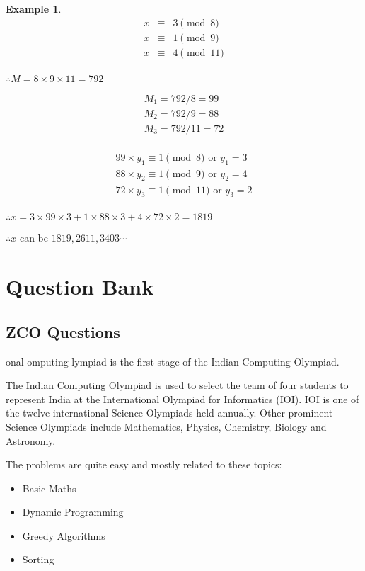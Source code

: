 \documentclass[twoside,12pt,a4paper,english]{book}
\theoremstyle{definition}
\newtheorem*{exmp}{Example}
\theoremstyle{problemstyle}
\theoremstyle{problemstyle}
\theoremstyle{problemstyle}
\begin{document}
\begin{exmp}
\[
\begin{array}{lcl}
x & \equiv &3 \pmod 8 \\
x & \equiv & 1 \pmod 9 \\
x & \equiv & 4 \pmod{11} \\
\end{array}
\]

$\therefore M = 8 \times 9 \times 11 = 792$

\[
\begin{array}{lcl}
M_1 =792/8 = 99 \\
M_2 = 792/9 = 88 \\
M_3 = 792/11 = 72 \\
\end{array}
\]

\[
\begin{array}{lcl}
99 \times y_1 \equiv 1 \pmod 8 \text{ or } y_1 = 3\\
88 \times y_2 \equiv 1 \pmod 9 \text{ or } y_2 = 4\\
72 \times y_3 \equiv 1 \pmod{11} \text{ or } y_3 = 2\\
\end{array}
\]

$\therefore x = 3 \times 99 \times 3 + 1 \times 88 \times 3 + 4 \times 72 \times 2 = 1819$

$\therefore x$ can be $1819, 2611, 3403 \cdots$ 
\end{exmp}

\part{Question Bank}

\chapter{ZCO Questions}

onal omputing lympiad is the first stage of the Indian Computing Olympiad.

The Indian Computing Olympiad is used to select the team of four students to represent India at the International Olympiad for Informatics (IOI). IOI is one of the twelve international Science Olympiads held annually. Other prominent Science Olympiads include Mathematics, Physics, Chemistry, Biology and Astronomy.

The problems are quite easy and mostly related to these topics:

\begin{itemize}
    \item Basic Maths
    \item Dynamic Programming
    \item Greedy Algorithms
    \item Sorting
\end{itemize}
\end{document}
